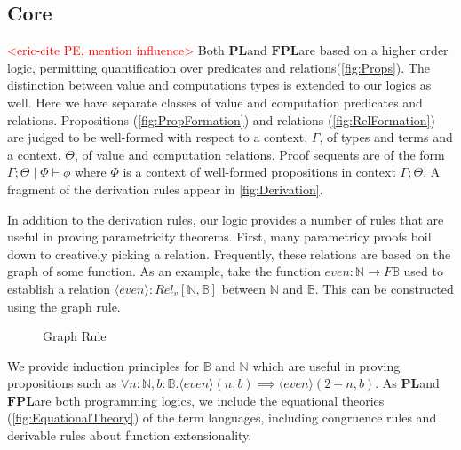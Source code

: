 \documentclass[acmsmall]{acmart}
\newcommand{\eric}[1]{\textcolor{red}{ <eric-#1> }}
\newcommand{\pl}{$\mathbf{PL}$}
\newcommand{\fpl}{$\mathbf{FPL}$}
\begin{document}
\subsection{Core}
\eric{cite PE, mention influence}
Both \pl\;and \fpl\;are based on a higher order logic, permitting quantification over predicates and relations(\cref{fig:Props}). The distinction between value and computations types is extended to our logics as well. Here we have separate classes of value and computation predicates and relations. Propositions (\cref{fig:PropFormation}) and relations (\cref{fig:RelFormation}) are judged to be well-formed with respect to a context, $\Gamma$, of types and terms and a context, $\Theta$, of value and computation relations.  Proof sequents are of the form $\Gamma ; \Theta \;|\; \Phi \vdash \phi$ where $\Phi$ is a context of well-formed propositions in context $\Gamma; \Theta$. A fragment of the derivation rules appear in \cref{fig:Derivation}. 

In addition to the derivation rules, our logic provides a number of rules that are useful in proving parametricity theorems. First, many parametricy proofs boil down to creatively picking a relation. Frequently, these relations are based on the graph of some function. As an example, take the function $even : \mathbb{N} \to F \mathbb{B}$ used to establish a relation $\langle even \rangle : Rel_v[\mathbb{N},\mathbb{B}]$ between $\mathbb{N}$ and $\mathbb{B}$. This can be constructed using the graph rule. 


\begin{figure}[H]
  \centering  
  \scriptsize

    
  \caption{Graph Rule}
  \label{fig:Graph}
\end{figure}


We provide induction principles for $\mathbb{B}$ and $\mathbb{N}$ which are useful in proving propositions such as $\forall n : \mathbb{N}, b : \mathbb{B}. \langle even \rangle (n,b) \implies \langle even \rangle(2 + n,b)$. As \pl\;and \fpl\;are both programming logics, we include the equational theories (\cref{fig:EquationalTheory}) of the term languages, including congruence rules and derivable rules about function extensionality. 





\end{document}
